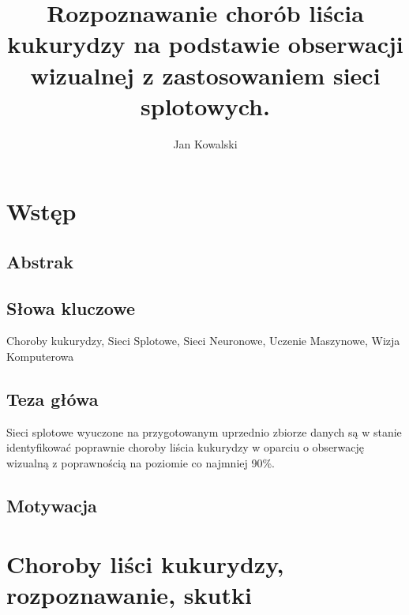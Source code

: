 \documentclass{article}
\title{Rozpoznawanie chorób liścia kukurydzy na podstawie obserwacji wizualnej z zastosowaniem 
sieci splotowych.}
\author{Jan Kowalski}
\begin{document}
\maketitle
\tableofcontents

\section{Wstęp}

\subsection{Abstrak}

\subsection{Słowa kluczowe}
Choroby kukurydzy, Sieci Splotowe, Sieci Neuronowe, Uczenie Maszynowe, Wizja Komputerowa

\subsection{Teza główa}
Sieci splotowe wyuczone na przygotowanym uprzednio zbiorze danych są w stanie identyfikować
poprawnie choroby liścia kukurydzy w oparciu o obserwację wizualną z poprawnością na poziomie
co najmniej 90\%.

\subsection{Motywacja}



\section{Choroby liści kukurydzy, rozpoznawanie, skutki}

\end{document}
